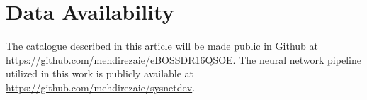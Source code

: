 \section*{Data Availability}
\label{sec:dataavail}

The catalogue described in this article will be made public in Github at \url{https://github.com/mehdirezaie/eBOSSDR16QSOE}. The neural network pipeline utilized in this work is publicly available at \url{https://github.com/mehdirezaie/sysnetdev}.